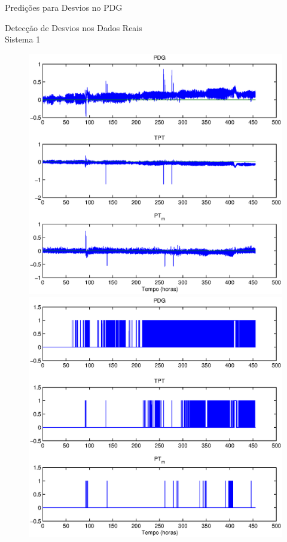\documentclass{beamer}
\begin{document}
\begin{frame}{Predições para Desvios no PDG}
\end{frame}

\begin{frame}{Detecção de Desvios nos Dados Reais\\Sistema 1}
    
    \begin{figure}[bt]
        \centering\hspace*{-15pt}
        \includegraphics[trim=1.5cm .7cm 1.1cm .7cm,clip=true,width=.55\textwidth]{figuras/real_sys1_res_d1.eps}
        \includegraphics[trim=1.5cm .7cm 1.1cm .7cm,clip=true,width=.55\textwidth]{figuras/real_sys1_sprt_d1.eps}
    \end{figure}
\end{frame}
\end{document}
